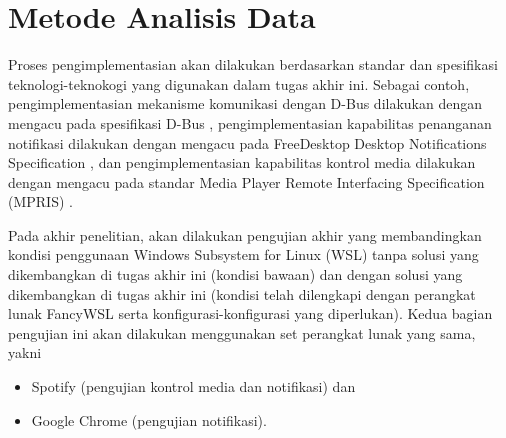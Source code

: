 \section{Metode Analisis Data}

Proses pengimplementasian akan dilakukan berdasarkan standar dan spesifikasi teknologi-teknokogi yang digunakan dalam tugas akhir ini. Sebagai contoh, pengimplementasian mekanisme komunikasi dengan D-Bus dilakukan dengan mengacu pada spesifikasi D-Bus \cite{dbus-specification}, pengimplementasian kapabilitas penanganan notifikasi dilakukan dengan mengacu pada FreeDesktop Desktop Notifications Specification \cite{xdg-desktop-notifications-specification}, dan pengimplementasian kapabilitas kontrol media dilakukan dengan mengacu pada standar Media Player Remote Interfacing Specification (MPRIS) \cite{xdg-mpris-specification}.

Pada akhir penelitian, akan dilakukan pengujian akhir yang membandingkan kondisi penggunaan Windows Subsystem for Linux (WSL) tanpa solusi yang dikembangkan di tugas akhir ini (kondisi bawaan) dan dengan solusi yang dikembangkan di tugas akhir ini (kondisi telah dilengkapi dengan perangkat lunak FancyWSL serta konfigurasi-konfigurasi yang diperlukan). Kedua bagian pengujian ini akan dilakukan menggunakan set perangkat lunak yang sama, yakni
\begin{itemize}
    \item Spotify (pengujian kontrol media dan notifikasi) dan
    \item Google Chrome (pengujian notifikasi).
\end{itemize}
